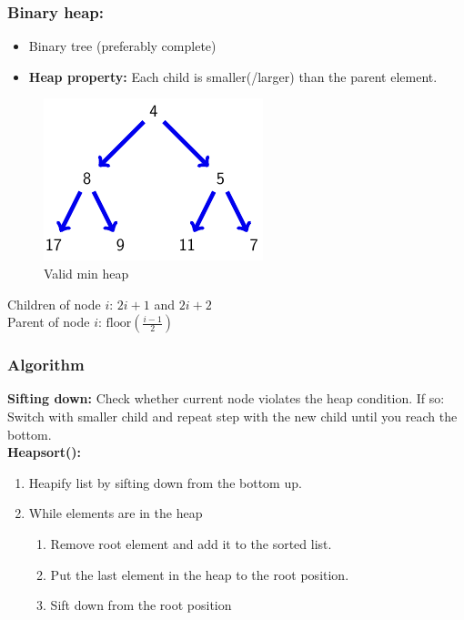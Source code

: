 \documentclass[12pt, a4paper]{scrartcl}
\begin{document}
\subsubsection{Binary heap:}
\begin{itemize}
\item Binary tree (preferably complete)
\item \textbf{Heap property:} Each child is smaller(/larger) than the parent element.
\end{itemize}
\begin{figure}[!htbp]
  \centering
  \includegraphics{minheap}
  \caption{Valid min heap}
  \label{fig:minheap}
\end{figure}
Children of node $i$: $2i+1$ and $2i+2$\\
Parent of node $i$: $\mathrm{floor}(\frac{i-1}{2})$

 \subsubsection{Algorithm}
 \label{sec:heapsort_algorithm}
 \textbf{Sifting down:} Check whether current node violates the heap condition. If so: Switch with smaller child and repeat step with the new child until you reach the bottom.\\
 \textbf{Heapsort():}
 \begin{enumerate}
 \item Heapify list by sifting down from the bottom up.
 \item While elements are in the heap
   \begin{enumerate}
   \item Remove root element and add it to the sorted list.
   \item Put the last element in the heap to the root position.
   \item Sift down from the root position
   \end{enumerate}
 \end{enumerate}
\end{document}
